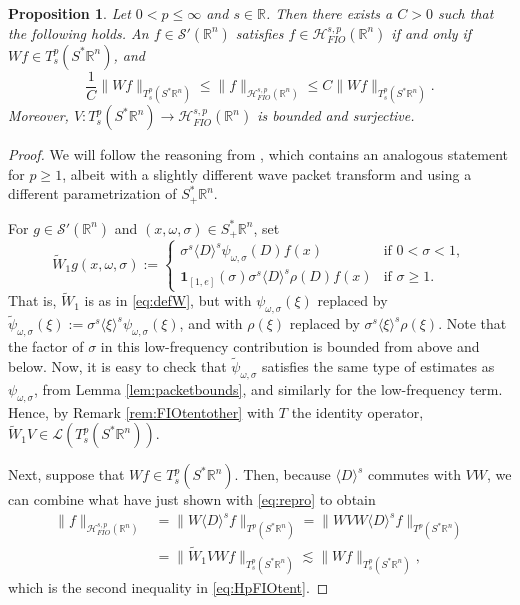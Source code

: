 \documentclass{amsart}
\newcommand {\Hps}{\mathcal{H}^{s,p}_{FIO}(\Rn)}
\newcommand {\ind}{\mathbf{1}}
\newcommand {\rb}{\rangle}
\newcommand {\lb}{\langle}
\newcommand {\La}{\mathcal{L}}
\newcommand {\R}{\mathbb R}
\newcommand {\Rn}{\mathbb{R}^{n}}
\newcommand {\Sp}{S^{*}\Rn}
\newcommand {\Spp}{S^{*}_{+}\Rn}
\newcommand {\Sw}{\mathcal{S}}
\newcommand {\w}{\omega}
\newcommand {\wt}{\widetilde}
\newtheorem{proposition}[theorem]{Proposition}
\theoremstyle{definition}
\numberwithin{equation}{section}
\begin{document}
\begin{proposition}\label{prop:HpFIOtent}
Let $0<p\leq \infty$ and $s\in\R$. Then there exists a $C>0$ such that the following holds. An $f\in\Sw'(\Rn)$ satisfies $f\in\Hps$ if and only if $Wf\in T^{p}_{s}(\Sp)$, and 
\begin{equation}\label{eq:HpFIOtent}
\frac{1}{C}\|Wf\|_{T^{p}_{s}(\Sp)}\leq \|f\|_{\Hps}\leq C\|Wf\|_{T^{p}_{s}(\Sp)}.
\end{equation}
Moreover, $V:T^{p}_{s}(\Sp)\to \Hps$ is bounded and surjective. 
\end{proposition}
\begin{proof}
We will follow %
the reasoning from \cite[Proposition 3.4]{Hassell-Rozendaal23}, which contains an analogous statement for $p\geq1$, albeit with a slightly different wave packet transform and using a different parametrization of $\Spp$.

For $g\in\Sw'(\Rn)$ and $(x,\w,\sigma)\in\Spp$, set
\[
\wt{W}_{1}g(x,\w,\sigma):=
\begin{cases}
\sigma^{s}\lb D\rb^{s}\psi_{\w,\sigma}(D)f(x)&\text{if }0<\sigma<1,\\
\ind_{[1,e]}(\sigma)\sigma^{s}\lb D\rb^{s}\rho(D)f(x)&\text{if }\sigma\geq1.
\end{cases}
\]
That is, $\wt{W}_{1}$ is as in \eqref{eq:defW}, but with $\psi_{\w,\sigma}(\xi)$ replaced by $\wt{\psi}_{\w,\sigma}(\xi):=\sigma^{s}\lb \xi\rb^{s}\psi_{\w,\sigma}(\xi)$,
and with $\rho(\xi)$ replaced by $\sigma^{s}\lb \xi\rb^{s}\rho(\xi)$. Note that the factor of $\sigma$ in this low-frequency contribution is bounded from above and below. Now, it is easy to check that $\wt{\psi}_{\w,\sigma}$ satisfies the same type of estimates as $\psi_{\w,\sigma}$, from Lemma \ref{lem:packetbounds}, and similarly for the low-frequency term. Hence, by Remark \ref{rem:FIOtentother} with $T$ the identity operator, $\wt{W}_{1}V\in \La(T^{p}_{s}(\Sp))$. 

Next, suppose that $Wf\in T^{p}_{s}(\Sp)$. Then, because $\lb D\rb^{s}$ commutes with $VW$, we can combine what have just shown with \eqref{eq:repro} to obtain
\begin{align*}
\|f\|_{\Hps}&=\|W\lb D\rb^{s}f\|_{T^{p}(\Sp)}=\|WVW\lb D\rb^{s}f\|_{T^{p}(\Sp)}\\
&=\|\wt{W}_{1}VWf\|_{T^{p}_{s}(\Sp)}\lesssim  \|Wf\|_{T^{p}_{s}(\Sp)},
\end{align*}
which is the second inequality in \eqref{eq:HpFIOtent}.


\end{proof}
\end{document}
